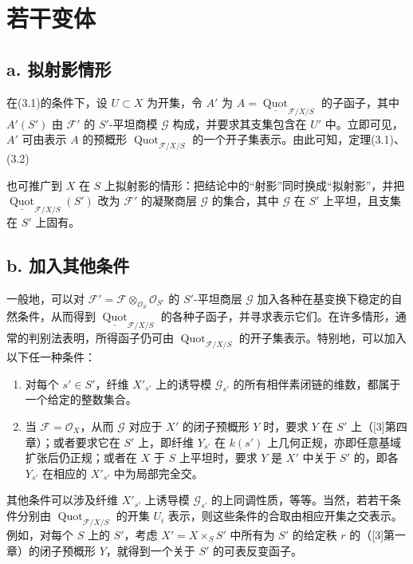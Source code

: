 \section{若干变体}
\subsection*{a. 拟射影情形}
在(3.1)的条件下，设 $U\subset X$ 为开集，令 $A'$ 为 $A=\underline{\operatorname{Quot}}_{\mathcal F/X/S}$ 的子函子，其中 $A'(S')$ 由 $\mathcal F'$ 的 $S'$-平坦商模 $\mathcal G$ 构成，并要求其支集包含在 $U'$ 中。立即可见，$A'$ 可由表示 $A$ 的预概形 $\operatorname{Quot}_{\mathcal F/X/S}$ 的一个开子集表示。由此可知，定理(3.1)、(3.2)

也可推广到 $X$ 在 $S$ 上拟射影的情形：把结论中的“射影”同时换成“拟射影”，并把 $\underline{\operatorname{Quot}}_{\mathcal F/X/S}(S')$ 改为 $\mathcal F'$ 的凝聚商层 $\mathcal G$ 的集合，其中 $\mathcal G$ 在 $S'$ 上平坦，且支集在 $S'$ 上固有。

\subsection*{b. 加入其他条件}
一般地，可以对 $\mathcal F'=\mathcal F\otimes_{\mathcal O_S}\mathcal O_{S'}$ 的 $S'$-平坦商层 $\mathcal G$ 加入各种在基变换下稳定的自然条件，从而得到 $\underline{\operatorname{Quot}}_{\mathcal F/X/S}$ 的各种子函子，并寻求表示它们。在许多情形，通常的判别法表明，所得函子仍可由 $\operatorname{Quot}_{\mathcal F/X/S}$ 的开子集表示。特别地，可以加入以下任一种条件：
\begin{enumerate}[label=\arabic*$^\circ$]
\item 对每个 $s'\in S'$，纤维 $X'_{s'}$ 上的诱导模 $\mathcal G_{s'}$ 的所有相伴素闭链的维数，都属于一个给定的整数集合。
\item 当 $\mathcal F=\mathcal O_X$，从而 $\mathcal G$ 对应于 $X'$ 的闭子预概形 $Y$ 时，要求 $Y$ 在 $S'$ 上（[3]第四章）；或者要求它在 $S'$ 上，即纤维 $Y_{s'}$ 在 $k(s')$ 上几何正规，亦即任意基域扩张后仍正规；或者在 $X$ 于 $S$ 上平坦时，要求 $Y$ 是 $X'$ 中关于 $S'$ 的，即各 $Y_{s'}$ 在相应的 $X'_{s'}$ 中为局部完全交。
\end{enumerate}
其他条件可以涉及纤维 $X'_{s'}$ 上诱导模 $\mathcal G_{s'}$ 的上同调性质，等等。当然，若若干条件分别由 $\operatorname{Quot}_{\mathcal F/X/S}$ 的开集 $U_i$ 表示，则这些条件的合取由相应开集之交表示。例如，对每个 $S$ 上的 $S'$，考虑 $X'=X\times_SS'$ 中所有为 $S'$ 的给定秩 $r$ 的（[3]第一章）的闭子预概形 $Y$，就得到一个关于 $S'$ 的可表反变函子。

